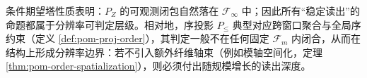 \begin{remark}[分辨率边界与序投影]\label{rem:pom-resolution-boundary}
条件期望塔性质表明：$P_Z$ 的可观测闭包自然落在 $\mathcal{F}_\infty$ 中；因此所有“稳定读出”的命题都属于分辨率可判定层级。相对地，序投影 $P_{\le}$ 典型对应跨窗口聚合与全局序约束（定义 \ref{def:pom-proj-order}），其判定一般不在任何固定 $\mathcal{F}_m$ 内闭合，从而在结构上形成分辨率边界：若不引入额外纤维轴束（例如模轴空间化，定理 \ref{thm:pom-order-spatialization}），则必须付出随规模增长的读出深度。
\end{remark}
